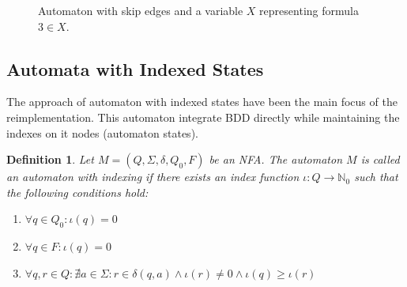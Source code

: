 \documentclass[pdflatex,sn-mathphys-num]{sn-jnl}%
\theoremstyle{thmstyleone}%
\theoremstyle{thmstyletwo}%
\theoremstyle{thmstylethree}%
\newtheorem{definition}{Definition}%
\begin{document}
        \begin{figure}[H]
            \centering
            \caption{Automaton with skip edges and a variable $X$ representing formula $3 \in X$.}
            \label{fig:skip_edges}
        \end{figure}

    \subsection{Automata with Indexed States}
        The approach of automaton with indexed states have been the main focus of the reimplementation. This automaton integrate BDD directly while maintaining the indexes on it nodes (automaton states).

        \vspace*{0.5em}

        \begin{definition}
            Let $M = (Q, \Sigma, \delta, Q_0, F)$ be an NFA. The automaton $M$ is called an automaton with indexing if there exists an index function $\iota : Q \rightarrow \mathbb{N}_0$ such that the following conditions hold:
            \begin{enumerate}[noindent]
                \item $\forall q \in Q_0 : \iota(q) = 0$
                \item $\forall q \in F : \iota(q) = 0$
                \item $\forall q, r \in Q : \nexists a \in \Sigma : r \in \delta(q, a) \land \iota(r) \neq 0 \land \iota(q) \geq \iota(r)$
            \end{enumerate}
        \end{definition}
\end{document}
